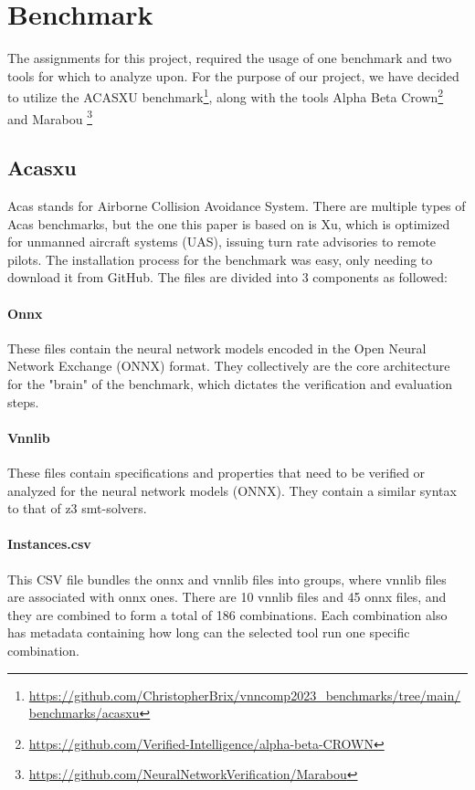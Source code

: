 
\chapter{Benchmark}\label{cap:intro}

The assignments for this project, required the usage of one benchmark and two tools for which to analyze upon. For the purpose of our project, we have decided to utilize the ACASXU benchmark\footnote{\url{https://github.com/ChristopherBrix/vnncomp2023_benchmarks/tree/main/benchmarks/acasxu}}, along with the tools Alpha Beta Crown\footnote{\url{https://github.com/Verified-Intelligence/alpha-beta-CROWN}} and Marabou \footnote{\url{https://github.com/NeuralNetworkVerification/Marabou}}
\section{Acasxu}\label{sect:acasxu}
Acas stands for Airborne Collision Avoidance System. There are multiple types of Acas benchmarks, but the one this paper is based on is Xu, which is optimized for unmanned aircraft systems (UAS), issuing turn rate advisories to remote pilots\cite{katz2017reluplex}. The installation process for the benchmark was easy, only needing to download it from GitHub\footnotemark[1]. The files are divided into 3 components as followed:
\subsubsection{Onnx}
These files contain the neural network models encoded in the Open Neural Network Exchange (ONNX) format\cite{onnx}. They collectively are the core architecture for the "brain" of the benchmark, which dictates the verification and evaluation steps.
\subsubsection{Vnnlib}
These files contain specifications and properties that need to be verified or analyzed for the neural network models (ONNX). They contain a similar syntax to that of z3 smt-solvers.
\newpage
\subsubsection{Instances.csv}
This CSV file bundles the onnx and vnnlib files into groups, where vnnlib files are associated with onnx ones. There are 10 vnnlib files and 45 onnx files, and they are combined to form a total of 186 combinations. Each combination also has metadata containing how long can the selected tool run one specific combination. 
\\


